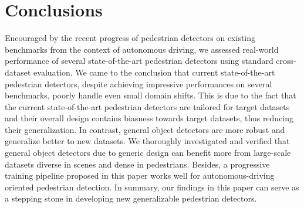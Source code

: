 \documentclass[final]{cvpr}
\begin{document}
 \section{Conclusions} \label{sec:conc}

Encouraged by the recent progress of pedestrian detectors on existing benchmarks from the context of autonomous driving, we assessed real-world performance of several state-of-the-art pedestrian detectors using standard cross-dataset evaluation. We came to the conclusion that current state-of-the-art pedestrian detectors, despite achieving impressive performances on several benchmarks, poorly handle even small domain shifts.
This is due to the fact that the current state-of-the-art pedestrian detectors are tailored for target datasets and their overall design contains biasness towards target datasets, thus reducing their generalization.
In contrast, general object detectors are more robust and generalize better to new datasets. We thoroughly investigated and verified that general object detectors due to generic design can benefit more from large-scale datasets diverse in scenes and dense in pedestrians. Besides, a progressive training  pipeline proposed in this paper works well for autonomous-driving  oriented  pedestrian  detection. In summary, our findings in this paper can serve as a stepping stone in developing new generalizable pedestrian detectors. 



 




{\small


}
\end{document}
